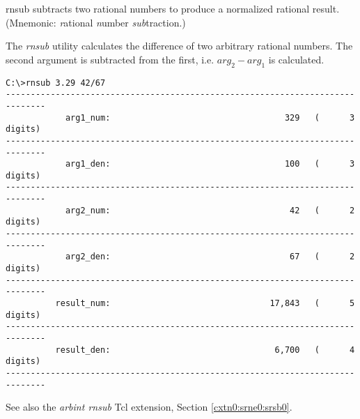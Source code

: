 \begin{dosutilcommandname}{rnsub}%
subtracts two rational numbers to produce a normalized rational result.  
(Mnemonic:  \emph{r}ational \emph{n}umber
\emph{sub}traction.)
\end{dosutilcommandname}

\begin{dosutilcommandsynopsis}
\end{dosutilcommandsynopsis}

\begin{dosutilcommanddescription}
The \emph{rnsub} utility calculates the difference of two arbitrary
rational numbers.  The second argument is subtracted from the first,
i.e. $arg_2 - arg_1$ is calculated.
\end{dosutilcommanddescription}

\begin{dosutilcommandsampleinvocations}
\begin{scriptsize}
\begin{verbatim}
C:\>rnsub 3.29 42/67
------------------------------------------------------------------------------
            arg1_num:                                   329   (      3 digits)
------------------------------------------------------------------------------
            arg1_den:                                   100   (      3 digits)
------------------------------------------------------------------------------
            arg2_num:                                    42   (      2 digits)
------------------------------------------------------------------------------
            arg2_den:                                    67   (      2 digits)
------------------------------------------------------------------------------
          result_num:                                17,843   (      5 digits)
------------------------------------------------------------------------------
          result_den:                                 6,700   (      4 digits)
------------------------------------------------------------------------------
\end{verbatim}
\end{scriptsize}
\end{dosutilcommandsampleinvocations}

\begin{dosutilcommandseealso}
See also the \emph{arbint rnsub} Tcl extension, 
Section \cxtnzeroxrefhyphen{}\ref{cxtn0:srne0:srsb0}.
\end{dosutilcommandseealso}


